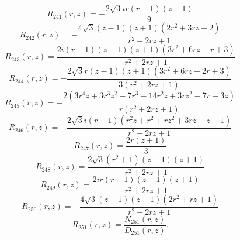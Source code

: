 \documentclass[11pt,a4paper]{article}
\begin{document}
\begin{equation}
R_{241}(r,z)=- \frac{2 \sqrt{3} i r \left(r - 1\right) \left(z - 1\right)}{9}
\label{eq:cat-rational-241}
\end{equation}
\begin{equation}
R_{242}(r,z)=- \frac{4 \sqrt{3} \left(z - 1\right) \left(z + 1\right) \left(2 r^{2} + 3 r z + 2\right)}{r^{2} + 2 r z + 1}
\label{eq:cat-rational-242}
\end{equation}
\begin{equation}
R_{243}(r,z)=\frac{2 i \left(r - 1\right) \left(z - 1\right) \left(z + 1\right) \left(3 r^{2} + 6 r z - r + 3\right)}{r^{2} + 2 r z + 1}
\label{eq:cat-rational-243}
\end{equation}
\begin{equation}
R_{244}(r,z)=- \frac{2 \sqrt{3} r \left(z - 1\right) \left(z + 1\right) \left(3 r^{2} + 6 r z - 2 r + 3\right)}{3 \left(r^{2} + 2 r z + 1\right)}
\label{eq:cat-rational-244}
\end{equation}
\begin{equation}
R_{245}(r,z)=- \frac{2 \left(3 r^{4} z + 3 r^{3} z^{2} - 7 r^{3} - 14 r^{2} z + 3 r z^{2} - 7 r + 3 z\right)}{r \left(r^{2} + 2 r z + 1\right)}
\label{eq:cat-rational-245}
\end{equation}
\begin{equation}
R_{246}(r,z)=- \frac{2 \sqrt{3} i \left(r - 1\right) \left(r^{2} z + r^{2} + r z^{2} + 3 r z + z + 1\right)}{r^{2} + 2 r z + 1}
\label{eq:cat-rational-246}
\end{equation}
\begin{equation}
R_{247}(r,z)=\frac{2 r \left(z + 1\right)}{3}
\label{eq:cat-rational-247}
\end{equation}
\begin{equation}
R_{248}(r,z)=\frac{2 \sqrt{3} \left(r^{2} + 1\right) \left(z - 1\right) \left(z + 1\right)}{r^{2} + 2 r z + 1}
\label{eq:cat-rational-248}
\end{equation}
\begin{equation}
R_{249}(r,z)=\frac{2 i r \left(r - 1\right) \left(z - 1\right) \left(z + 1\right)}{r^{2} + 2 r z + 1}
\label{eq:cat-rational-249}
\end{equation}
\begin{equation}
R_{250}(r,z)=- \frac{4 \sqrt{3} \left(z - 1\right) \left(z + 1\right) \left(2 r^{2} + r z + 1\right)}{r^{2} + 2 r z + 1}
\label{eq:cat-rational-250}
\end{equation}
\begin{equation}
R_{251}(r,z)=\frac{N_{251}(r,z)}{D_{251}(r,z)}.
\label{eq:cat-rational-251}
\end{equation}
\end{document}
